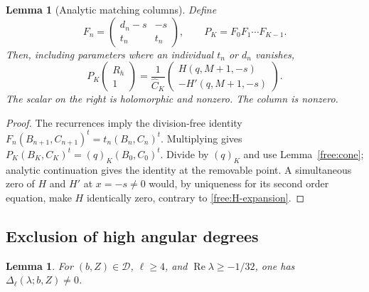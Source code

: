 \documentclass[11pt]{article}
\numberwithin{equation}{section}
\newtheorem{lemma}[theorem]{Lemma}
\theoremstyle{definition}
\theoremstyle{remark}
\begin{document}
\begin{lemma}[Analytic matching columns]\label{free:columns}
Define
\begin{equation}\label{free:backward}
 F_n=\begin{pmatrix}d_n-s&-s\\t_n&t_n\end{pmatrix},\qquad
 P_K=F_0F_1\cdots F_{K-1}.
\end{equation}
Then, including parameters where an individual $t_n$ or $d_n$ vanishes,
\begin{equation}\label{free:column-identity}
 P_K\begin{pmatrix}R_h\\1\end{pmatrix}
 =\frac1{\widehat C_K}
 \begin{pmatrix}H(q,M+1,-s)\\-H'(q,M+1,-s)\end{pmatrix}.
\end{equation}
The scalar on the right is holomorphic and nonzero.  The column is
nonzero.
\end{lemma}

\begin{proof}
The recurrences imply the division-free identity
$F_n(B_{n+1},C_{n+1})^t=t_n(B_n,C_n)^t$.  Multiplying gives
$P_K(B_K,C_K)^t=(q)_K(B_0,C_0)^t$.  Divide by $(q)_K$ and use
Lemma~\ref{free:cone}; analytic continuation gives the identity at the
removable point.  A simultaneous zero of $H$ and $H'$ at $x=-s\ne0$
would, by uniqueness for its second order equation, make $H$ identically
zero, contrary to \eqref{free:H-expansion}.
\end{proof}

\subsection{Exclusion of high angular degrees}

\begin{lemma}\label{free:high-angular}
For $(b,Z)\in\mathcal D$, $\ell\ge4$, and
$\operatorname{Re}\lambda\ge-1/32$, one has $\Delta_\ell(\lambda;b,Z)\ne0$.
\end{lemma}
\end{document}
